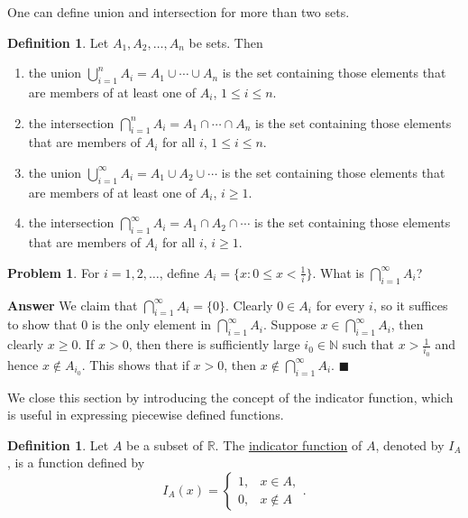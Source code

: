 \documentclass[12pt,letterpaper]{book}
\numberwithin{equation}{section}
\theoremstyle{definition}
\newtheorem{defi}[thm]{\textbf{Definition}}
\newtheorem{problem}[thm]{\textbf{Problem}}
\newenvironment{answer}{\noindent\textbf{Answer}}{\hfill$\blacksquare$\vspace{0.1in}}
\begin{document}
One can define union and intersection for more than two sets.
\begin{defi} Let $A_1,A_2,\ldots,A_n$ be sets. Then
\begin{enumerate}
\item the union $\displaystyle{\bigcup_{i=1}^n A_i}=A_1\cup\cdots\cup A_n$ is the set containing those elements that are members of at least one of $A_i$, $1\leq i\leq n$.
\item the intersection $\displaystyle{\bigcap_{i=1}^n A_i}=A_1\cap\cdots\cap A_n$ is the set containing those elements that are members of $A_i$ for all $i$, $1\leq i \leq n$.
\item the union $\displaystyle{\bigcup_{i=1}^\infty A_i}=A_1\cup A_2\cup \cdots $ is the set containing those elements that are members of at least one of $A_i$, $i\geq 1$.
\item the intersection $\displaystyle{\bigcap_{i=1}^\infty A_i}=A_1\cap A_2\cap \cdots$ is the set containing those elements that are members of $A_i$ for all $i$, $i\geq 1$.
\end{enumerate}
\end{defi}

\begin{problem} For $i=1,2,\ldots$, define $A_i=\{x: 0\leq x <\frac{1}{i}\}$. What is $\displaystyle{\bigcap_{i=1}^\infty A_i}$?
\end{problem}

\begin{answer}
We claim that $\displaystyle{\bigcap_{i=1}^\infty A_i}=\{0\}$. Clearly $0\in A_i$ for every $i$, so it suffices to show that $0$ is the only element in $\displaystyle{\bigcap_{i=1}^\infty A_i}$. Suppose $x\in \displaystyle{\bigcap_{i=1}^\infty A_i}$, then clearly $x\geq 0$. If $x>0$, then there is sufficiently large $i_0\in \mathbb{N}$ such that $x>\frac{1}{i_0}$ and hence $x\notin A_{i_0}$. This shows that if $x>0$, then $x\notin \displaystyle{\bigcap_{i=1}^\infty A_i}$.
\end{answer}

We close this section by introducing the concept of the indicator function, which is useful in expressing piecewise defined functions.

\begin{defi}
Let $A$ be a subset of $\mathbb{R}$. The \underline{indicator function} of $A$, denoted by $I_A$, is a function defined by
$$I_A(x)=\begin{cases} 1,&x\in A,\\ 0, &x\notin A \end{cases}.$$
\end{defi}
\end{document}
